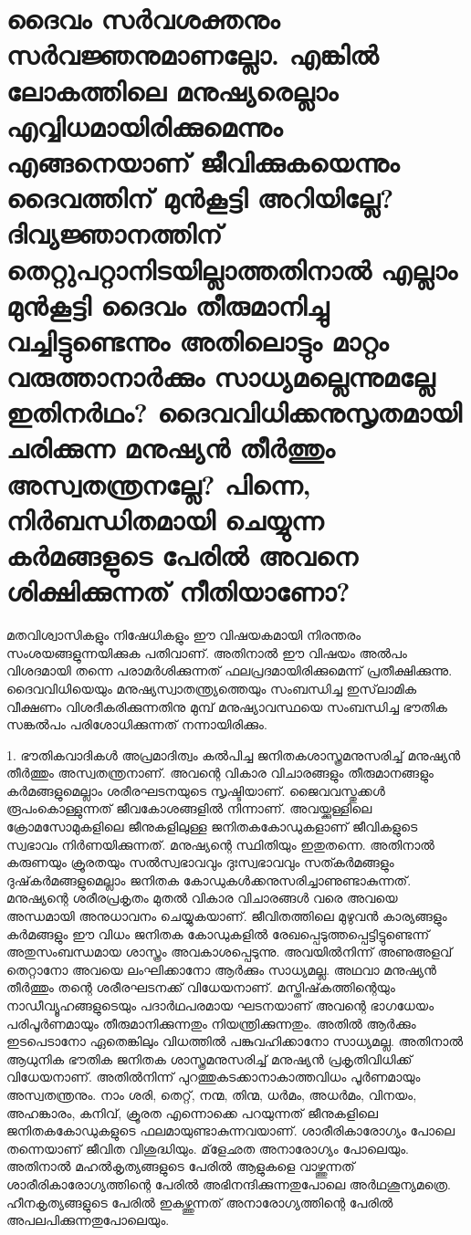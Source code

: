    \section{ദൈവം സര്‍വശക്തനും സര്‍വജ്ഞനുമാണല്ലോ. എങ്കില്‍ ലോകത്തിലെ മനുഷ്യരെല്ലാം എവ്വിധമായിരിക്കുമെന്നും എങ്ങനെയാണ് ജീവിക്കുകയെന്നും ദൈവത്തിന് മുന്‍കൂട്ടി അറിയില്ലേ? ദിവ്യജ്ഞാനത്തിന് തെറ്റുപറ്റാനിടയില്ലാത്തതിനാല്‍ എല്ലാം മുന്‍കൂട്ടി ദൈവം തീരുമാനിച്ചു വച്ചിട്ടുണ്ടെന്നും അതിലൊട്ടും മാറ്റം വരുത്താനാര്‍ക്കും സാധ്യമല്ലെന്നുമല്ലേ ഇതിനര്‍ഥം? ദൈവവിധിക്കനുസൃതമായി ചരിക്കുന്ന മനുഷ്യന്‍ തീര്‍ത്തും അസ്വതന്ത്രനല്ലേ? പിന്നെ, നിര്‍ബന്ധിതമായി ചെയ്യുന്ന കര്‍മങ്ങളുടെ പേരില്‍ അവനെ ശിക്ഷിക്കുന്നത് നീതിയാണോ?}

   
മതവിശ്വാസികളും നിഷേധികളും ഈ വിഷയകമായി നിരന്തരം സംശയങ്ങളുന്നയിക്കുക പതിവാണ്. അതിനാല്‍ ഈ വിഷയം അല്‍പം വിശദമായി തന്നെ പരാമര്‍ശിക്കുന്നത് ഫലപ്രദമായിരിക്കുമെന്ന് പ്രതീക്ഷിക്കുന്നു.
ദൈവവിധിയെയും മനുഷ്യസ്വാതന്ത്യ്രത്തെയും സംബന്ധിച്ച ഇസ്‌ലാമിക വീക്ഷണം വിശദീകരിക്കുന്നതിനു മുമ്പ് മനുഷ്യാവസ്ഥയെ സംബന്ധിച്ച ഭൗതിക സങ്കല്‍പം പരിശോധിക്കുന്നത് നന്നായിരിക്കും.


1. ഭൗതികവാദികള്‍ അപ്രമാദിത്വം കല്‍പിച്ച ജനിതകശാസ്ത്രമനുസരിച്ച് മനുഷ്യന്‍ തീര്‍ത്തും അസ്വതന്ത്രനാണ്. അവന്റെ വികാര വിചാരങ്ങളും തീരുമാനങ്ങളും കര്‍മങ്ങളുമെല്ലാം ശരീരഘടനയുടെ സൃഷ്ടിയാണ്. ജൈവവസ്തുക്കള്‍ രൂപംകൊള്ളുന്നത് ജീവകോശങ്ങളില്‍ നിന്നാണ്. അവയ്ക്കുള്ളിലെ ക്രോമസോമുകളിലെ ജീനുകളിലുള്ള ജനിതകകോഡുകളാണ് ജീവികളുടെ സ്വഭാവം നിര്‍ണയിക്കുന്നത്. മനുഷ്യന്റെ സ്ഥിതിയും ഇതുതന്നെ. അതിനാല്‍ കരുണയും ക്രൂരതയും സല്‍സ്വഭാവവും ദുഃസ്വഭാവവും സത്കര്‍മങ്ങളും ദുഷ്‌കര്‍മങ്ങളുമെല്ലാം ജനിതക കോഡുകള്‍ക്കനുസരിച്ചാണുണ്ടാകുന്നത്. മനുഷ്യന്റെ ശരീരപ്രകൃതം മുതല്‍ വികാര വിചാരങ്ങള്‍ വരെ അവയെ അന്ധമായി അനുധാവനം ചെയ്യുകയാണ്. ജീവിതത്തിലെ മുഴുവന്‍ കാര്യങ്ങളും കര്‍മങ്ങളും ഈ വിധം ജനിതക കോഡുകളില്‍ രേഖപ്പെടുത്തപ്പെട്ടിട്ടുണ്ടെന്ന് അതുസംബന്ധമായ ശാസ്ത്രം അവകാശപ്പെടുന്നു. അവയില്‍നിന്ന് അണുഅളവ് തെറ്റാനോ അവയെ ലംഘിക്കാനോ ആര്‍ക്കും സാധ്യമല്ല. അഥവാ മനുഷ്യന്‍ തീര്‍ത്തും തന്റെ ശരീരഘടനക്ക് വിധേയനാണ്. മസ്തിഷ്‌കത്തിന്റെയും നാഡീവ്യൂഹങ്ങളുടെയും പദാര്‍ഥപരമായ ഘടനയാണ് അവന്റെ ഭാഗധേയം പരിപൂര്‍ണമായും തീരുമാനിക്കുന്നതും നിയന്ത്രിക്കുന്നതും. അതില്‍ ആര്‍ക്കും ഇടപെടാനോ ഏതെങ്കിലും വിധത്തില്‍ പങ്കുവഹിക്കാനോ സാധ്യമല്ല. അതിനാല്‍ ആധുനിക ഭൗതിക ജനിതക ശാസ്ത്രമനുസരിച്ച് മനുഷ്യന്‍ പ്രകൃതിവിധിക്ക് വിധേയനാണ്. അതില്‍നിന്ന് പുറത്തുകടക്കാനാകാത്തവിധം പൂര്‍ണമായും അസ്വതന്ത്രനും. നാം ശരി, തെറ്റ്, നന്മ, തിന്മ, ധര്‍മം, അധര്‍മം, വിനയം, അഹങ്കാരം, കനിവ്, ക്രൂരത എന്നൊക്കെ പറയുന്നത് ജീനുകളിലെ ജനിതകകോഡുകളുടെ ഫലമായുണ്ടാകുന്നവയാണ്. ശാരീരികാരോഗ്യം പോലെ തന്നെയാണ് ജീവിത വിശുദ്ധിയും. മ്‌ളേഛത അനാരോഗ്യം പോലെയും. അതിനാല്‍ മഹല്‍കൃത്യങ്ങളുടെ പേരില്‍ ആളുകളെ വാഴ്ത്തുന്നത് ശാരീരികാരോഗ്യത്തിന്റെ പേരില്‍ അഭിനന്ദിക്കുന്നതുപോലെ അര്‍ഥശൂന്യമത്രെ. ഹീനകൃത്യങ്ങളുടെ പേരില്‍ ഇകഴ്ത്തുന്നത് അനാരോഗ്യത്തിന്റെ പേരില്‍ അപലപിക്കുന്നതുപോലെയും.


